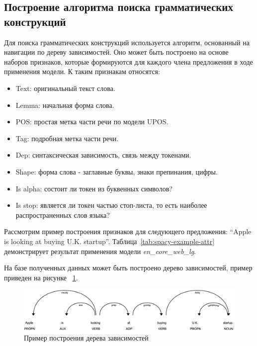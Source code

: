 \subsection{Построение алгоритма поиска грамматических конструкций}
Для поиска грамматических конструкций используется алгоритм, основанный на навигации по дереву зависимостей. Оно может быть построено на основе наборов признаков, которые формируются для каждого члена предложения в ходе применения модели. К таким признакам относятся: 
\begin{itemize}
  \item Text: оригинальный текст слова.
  \item Lemma: начальная форма слова.
  \item POS: простая метка части речи по модели UPOS.
  \item Tag: подробная метка части речи.
  \item Dep: синтаксическая зависимость, связь между токенами.
  \item Shape: форма слова - заглавные буквы, знаки препинания, цифры.
  \item Is alpha: состоит ли токен из буквенных символов?
  \item Is stop: является ли токен частью стоп-листа, то есть наиболее распространенных слов языка?
\end{itemize}

Рассмотрим пример построения признаков для следующего предложения:
“Apple is looking at buying U.K. startup”. Таблица~\ref{tab:spacy-example-attr} демонстрирует результат применения модели \emph{en\_core\_web\_lg}.

На базе полученных данных может быть построено дерево зависимостей, пример приведен на рисунке ~\ref{fig:sentence}.

\begin{figure}[h]
\centering
\includegraphics[width=\textwidth]{img/sentence}
\caption{\label{fig:sentence}Пример построения дерева зависимостей}
\end{figure}

